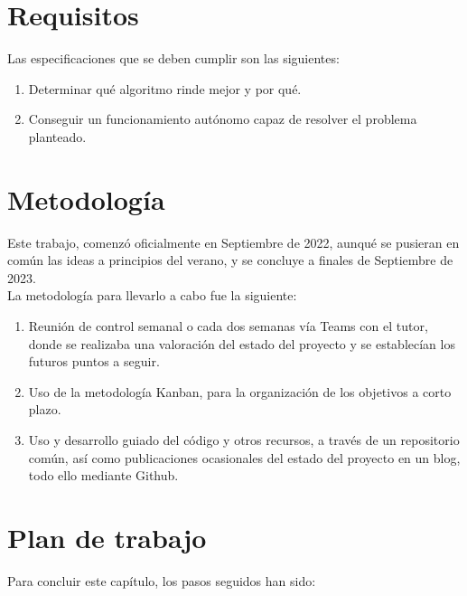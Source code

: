 \section{Requisitos}
\label{sec:requisitos}

Las especificaciones que se deben cumplir son las siguientes:

\begin{enumerate}
	\item Determinar qué algoritmo rinde mejor y por qué.
	\item Conseguir un funcionamiento autónomo capaz de resolver el problema planteado.
\end{enumerate}

\section{Metodología}
\label{sec:metodologia}

Este trabajo, comenzó oficialmente en Septiembre de 2022, aunqué se pusieran en común las ideas a principios del verano, y se concluye a finales de Septiembre de 2023.\\ 

La metodología para llevarlo a cabo fue la siguiente:

\begin{enumerate}
	\item Reunión de control semanal o cada dos semanas vía Teams con el tutor, donde se realizaba una valoración del estado del proyecto y se establecían los futuros puntos a seguir.
	\item Uso de la metodología Kanban, para la organización de los objetivos a corto plazo.
	\item Uso y desarrollo guiado del código y otros recursos, a través de un repositorio común, así como publicaciones ocasionales del estado del proyecto en un blog, todo ello mediante Github.
\end{enumerate}

\section{Plan de trabajo}
\label{sec:plantrabajo}

Para concluir este capítulo, los pasos seguidos han sido:

